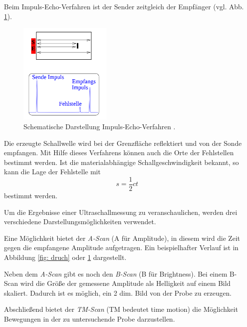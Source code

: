 Beim Impuls-Echo-Verfahren ist der Sender zeitgleich der Empfänger (vgl. Abb. \ref{fig: echo}).
\begin{figure}[h]
  \centering
  \includegraphics[width=0.4\textwidth]{pics/impuls_echo.png}
  \caption{Schematische Darstellung Impuls-Echo-Verfahren \cite{anleitungus1}.}
  \label{fig: echo}
  \end{figure}
Die erzeugte Schallwelle wird bei der Grenzfläche reflektiert und von der Sonde %
empfangen. Mit Hilfe dieses Verfahrens können auch die Orte der Fehlstellen bestimmt
werden. Ist die materialabhängige Schallgeschwindigkeit bekannt, so kann die
Lage der Fehlstelle mit
\begin{equation}
  \label{eq:lage_fehl}
  s=\frac{1}{2}ct
\end{equation}
bestimmt werden.

Um die Ergebnisse einer Ultraschallmessung zu veranschaulichen, werden drei verschiedene
Darstellungsmöglichkeiten verwendet.

Eine Möglichkeit bietet der \emph{A-Scan} (A für Amplitude), in diesem %
wird die Zeit gegen die empfangene Amplitude aufgetragen.
Ein beispielhafter Verlauf ist in Abbildung \ref{fig: druch} oder \ref{fig: echo}
dargestellt.

Neben dem \emph{A-Scan} gibt es noch den \emph{B-Scan} (B für Brightness).
Bei einem B-Scan wird die Größe der gemessene Amplitude als Helligkeit
auf einem Bild skaliert. Dadurch ist es möglich, ein 2 dim. Bild von der Probe zu erzeugen.

Abschließend bietet der \emph{TM-Scan} (TM bedeutet time motion) die Möglichkeit
Bewegungen in der zu untersuchende Probe darzustellen.

